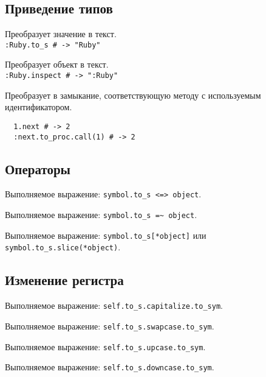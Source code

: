 \subsection*{Приведение типов}

\begin{methodlist}
  Преобразует значение в текст.
  \\\verb!:Ruby.to_s # -> "Ruby"!

  Преобразует объект в текст.
  \\\verb!:Ruby.inspect # -> ":Ruby"!


  Преобразует в замыкание, соответствующую методу с используемым идентификатором.
  \begin{verbatim}
  1.next # -> 2
  :next.to_proc.call(1) # -> 2
  \end{verbatim}  
\end{methodlist}

\subsection*{Операторы}

\begin{methodlist}
  Выполняемое выражение: \verb!symbol.to_s <=> object!.

  Выполняемое выражение: \verb!symbol.to_s =~ object!.

  Выполняемое выражение: \verb!symbol.to_s[*object]! или \verb!symbol.to_s.slice(*object)!.
\end{methodlist}

\subsection*{Изменение регистра}

\begin{methodlist}
  Выполняемое выражение: \verb!self.to_s.capitalize.to_sym!.

  Выполняемое выражение: \verb!self.to_s.swapcase.to_sym!.

  Выполняемое выражение: \verb!self.to_s.upcase.to_sym!.

  Выполняемое выражение: \verb!self.to_s.downcase.to_sym!.
\end{methodlist}

